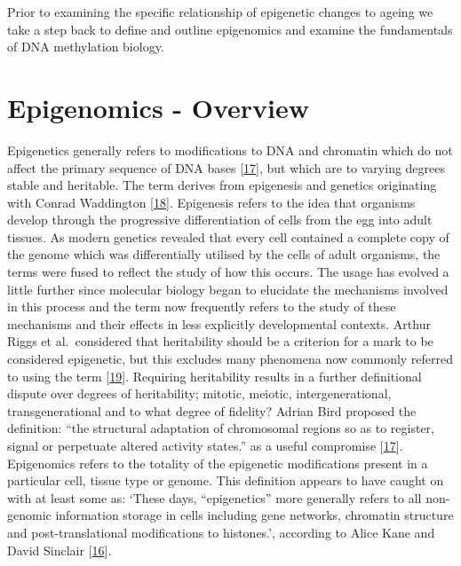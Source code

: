 \documentclass[
]{book}
\begin{document}
Prior to examining the specific relationship of epigenetic changes to ageing we take a step back to define and outline epigenomics and examine the fundamentals of DNA methylation biology.

\hypertarget{epigenomics---overview}{%
\section{Epigenomics - Overview}\label{epigenomics---overview}}

Epigenetics generally refers to modifications to DNA and chromatin which do not affect the primary sequence of DNA bases {[}\protect\hyperlink{ref-Bird2007}{17}{]}, but which are to varying degrees stable and heritable.
The term derives from epigenesis and genetics originating with Conrad Waddington {[}\protect\hyperlink{ref-Waddington1942}{18}{]}.
Epigenesis refers to the idea that organisms develop through the progressive differentiation of cells from the egg into adult tissues.
As modern genetics revealed that every cell contained a complete copy of the genome which was differentially utilised by the cells of adult organisms, the terms were fused to reflect the study of how this occurs.
The usage has evolved a little further since molecular biology began to elucidate the mechanisms involved in this process and the term now frequently refers to the study of these mechanisms and their effects in less explicitly developmental contexts.
Arthur Riggs et al.~considered that heritability should be a criterion for a mark to be considered epigenetic, but this excludes many phenomena now commonly referred to using the term {[}\protect\hyperlink{ref-Russo1996}{19}{]}.
Requiring heritability results in a further definitional dispute over degrees of heritability; mitotic, meiotic, intergenerational, transgenerational and to what degree of fidelity?
Adrian Bird proposed the definition: ``the structural adaptation of chromosomal regions so as to register, signal or perpetuate altered activity states.'' as a useful compromise {[}\protect\hyperlink{ref-Bird2007}{17}{]}.
Epigenomics refers to the totality of the epigenetic modifications present in a particular cell, tissue type or genome.
This definition appears to have caught on with at least some as: `These days, ``epigenetics'' more generally refers to all non-genomic information storage in cells including gene networks, chromatin structure and post-translational modifications to histones.', according to Alice Kane and David Sinclair {[}\protect\hyperlink{ref-Kane2019}{16}{]}.
\end{document}
